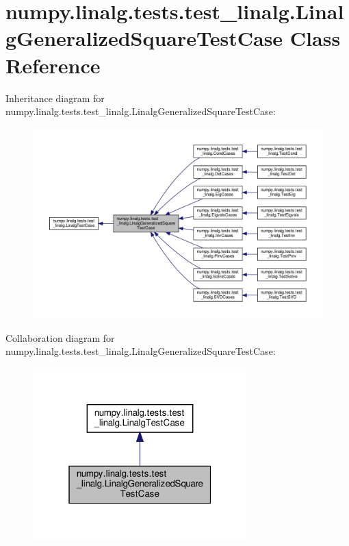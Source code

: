 \hypertarget{classnumpy_1_1linalg_1_1tests_1_1test__linalg_1_1LinalgGeneralizedSquareTestCase}{}\section{numpy.\+linalg.\+tests.\+test\+\_\+linalg.\+Linalg\+Generalized\+Square\+Test\+Case Class Reference}
\label{classnumpy_1_1linalg_1_1tests_1_1test__linalg_1_1LinalgGeneralizedSquareTestCase}


Inheritance diagram for numpy.\+linalg.\+tests.\+test\+\_\+linalg.\+Linalg\+Generalized\+Square\+Test\+Case\+:
\nopagebreak
\begin{figure}[H]
\begin{center}
\leavevmode
\includegraphics[width=350pt]{classnumpy_1_1linalg_1_1tests_1_1test__linalg_1_1LinalgGeneralizedSquareTestCase__inherit__graph}
\end{center}
\end{figure}


Collaboration diagram for numpy.\+linalg.\+tests.\+test\+\_\+linalg.\+Linalg\+Generalized\+Square\+Test\+Case\+:
\nopagebreak
\begin{figure}[H]
\begin{center}
\leavevmode
\includegraphics[width=235pt]{classnumpy_1_1linalg_1_1tests_1_1test__linalg_1_1LinalgGeneralizedSquareTestCase__coll__graph}
\end{center}
\end{figure}
